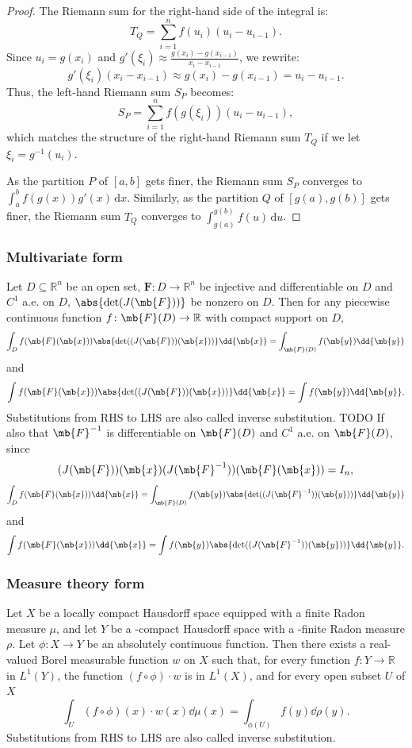 \documentclass[a4paper,12pt]{report}
\begin{document}
\begin{itemize}
\begin{itemize}
\begin{proof}
The Riemann sum for the right-hand side of the integral is:
\[T_Q = \sum_{i=1}^n f(u_i) (u_i - u_{i-1}).\]
Since \(u_i = g(x_i)\) and \(g'(\xi_i) \approx \frac{g(x_i) - g(x_{i-1})}{x_i - x_{i-1}}\), we rewrite:
\[ g'(\xi_i) (x_i - x_{i-1}) \approx g(x_i) - g(x_{i-1}) = u_i - u_{i-1}. \]
Thus, the left-hand Riemann sum \(S_P\) becomes:
\[ S_P = \sum_{i=1}^n f(g(\xi_i)) (u_i - u_{i-1}),\]
which matches the structure of the right-hand Riemann sum \(T_Q\) if we let \(\xi_i = g^{-1}(u_i)\).

As the partition \(P\) of \([a, b]\) gets finer, the Riemann sum \(S_P\) converges to \(\int_a^b f(g(x)) g'(x) \, \mathrm{d}x\). Similarly, as the partition \(Q\) of \([g(a), g(b)]\) gets finer, the Riemann sum \(T_Q\) converges to \(\int_{g(a)}^{g(b)} f(u) \, \mathrm{d}u\).
\end{proof}
\subsubsection{Multivariate form}
Let $D\subseteq\mathbb{R}^n$ be an open set, $\mathbf{F}\colon D\to\mathbb{R}^n$ be injective and differentiable on $D$ and $C^1$ a.e. on $D$, $\abs{\det(J(\mb{F}))}$ be nonzero on $D$. Then for any piecewise continuous function $f\colon\mb{F}(D)\to\mathbb{R}$ with compact support on $D$,
\[\int_Df(\mb{F}(\mb{x}))\abs{\det((J(\mb{F}))(\mb{x}))}\dd{\mb{x}}=\int_{\mb{F}(D)}f(\mb{y})\dd{\mb{y}}\]
and
\[\int f(\mb{F}(\mb{x}))\abs{\det((J(\mb{F}))(\mb{x}))}\dd{\mb{x}}=\int f(\mb{y})\dd{\mb{y}}.\]
Substitutions from RHS to LHS are also called inverse substitution.
\bpr
TODO
\epr
If also that $\mb{F}^{-1}$ is differentiable on $\mb{F}(D)$ and $C^1$ a.e. on $\mb{F}(D)$, since
\[(J(\mb{F}))(\mb{x})(J(\mb{F}^{-1}))(\mb{F}(\mb{x}))=I_n,\]
\[\int_Df(\mb{F}(\mb{x}))\dd{\mb{x}}=\int_{\mb{F}(D)}f(\mb{y})\abs{\det((J(\mb{F}^{-1}))(\mb{y}))}\dd{\mb{y}}\]
and
\[\int f(\mb{F}(\mb{x}))\dd{\mb{x}}=\int f(\mb{y})\abs{\det((J(\mb{F}^{-1}))(\mb{y}))}\dd{\mb{y}}.\]
\subsubsection{Measure theory form}
Let $X$ be a locally compact Hausdorff space equipped with a finite Radon measure $μ$, and let $Y$ be a \text{\textsigma}-compact Hausdorff space with a \text{\textsigma}-finite Radon measure $\rho$. Let $\phi\colon X\to Y$ be an absolutely continuous function. Then there exists a real-valued Borel measurable function $w$ on $X$ such that, for every function $f\colon Y\to\mathbb{R}$ in $L^1(Y)$, the function $(f\circ\phi)\cdot w$ is in $L^1(X)$, and for every open subset $U$ of $X$
\[\int_U(f\circ\phi)(x)\cdot w(x)\dd{\mu(x)}=\int_{\phi(U)}f(y)\dd{\rho(y)}.\]
Substitutions from RHS to LHS are also called inverse substitution.


\end{itemize}
\end{itemize}
\end{document}
